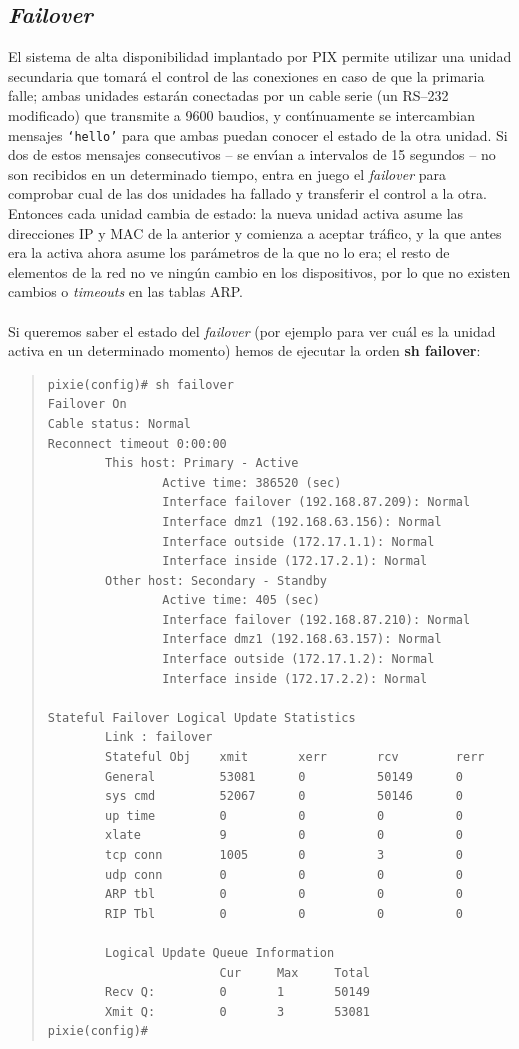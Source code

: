 \subsection{{\it Failover}}
El sistema de alta disponibilidad implantado por PIX permite utilizar una 
unidad secundaria que tomar\'a el control de las conexiones en caso de que
la primaria falle; ambas unidades estar\'an conectadas por un cable serie (un
RS--232 modificado) que transmite a 9600 baudios, y cont\'{\i}nuamente se
intercambian mensajes {\tt `hello'} para que ambas puedan conocer el estado de 
la otra unidad. Si dos de estos mensajes consecutivos -- se env\'{\i}an a 
intervalos de 15 segundos -- no son recibidos en un determinado tiempo, entra
en juego el {\it failover} para comprobar cual de las dos unidades ha fallado y
transferir el control a la otra. Entonces cada unidad cambia de estado: la nueva
unidad activa asume las direcciones IP y MAC de la anterior y comienza a 
aceptar tr\'afico, y la que antes era la activa ahora asume los par\'ametros de
la que no lo era; el resto de elementos de la red no ve ning\'un cambio en los
dispositivos, por lo que no existen cambios o {\it timeouts} en las tablas 
ARP.\\
\\Si queremos saber el estado del {\it failover} (por ejemplo para ver cu\'al 
es la unidad activa en un determinado momento) hemos de ejecutar la orden
{\bf sh failover}:
\begin{quote}
\begin{verbatim}
pixie(config)# sh failover
Failover On
Cable status: Normal
Reconnect timeout 0:00:00
        This host: Primary - Active 
                Active time: 386520 (sec)
                Interface failover (192.168.87.209): Normal 
                Interface dmz1 (192.168.63.156): Normal 
                Interface outside (172.17.1.1): Normal
                Interface inside (172.17.2.1): Normal 
        Other host: Secondary - Standby 
                Active time: 405 (sec)
                Interface failover (192.168.87.210): Normal 
                Interface dmz1 (192.168.63.157): Normal 
                Interface outside (172.17.1.2): Normal
                Interface inside (172.17.2.2): Normal 

Stateful Failover Logical Update Statistics
        Link : failover
        Stateful Obj    xmit       xerr       rcv        rerr      
        General         53081      0          50149      0         
        sys cmd         52067      0          50146      0         
        up time         0          0          0          0         
        xlate           9          0          0          0         
        tcp conn        1005       0          3          0         
        udp conn        0          0          0          0         
        ARP tbl         0          0          0          0         
        RIP Tbl         0          0          0          0         

        Logical Update Queue Information
                        Cur     Max     Total
        Recv Q:         0       1       50149
        Xmit Q:         0       3       53081
pixie(config)#  
\end{verbatim}
\end{quote}
